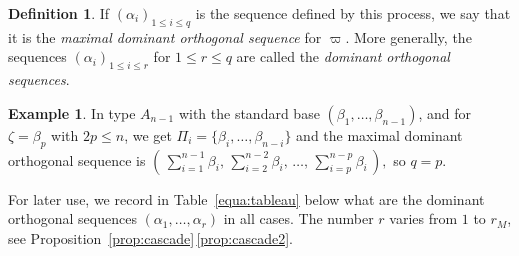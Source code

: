 \documentclass[JEP,XML,SOM,Unicode,NoFloatCountersInSection]{cedram}
\theoremstyle{plain}
\theoremstyle{definition}
\newtheorem{defi}[theo]{Definition}
\newtheorem{exem}[theo]{Example}
\begin{document}
\begin{defi}
\label{def:cascade}
If $(\alpha_i)_{1 \leq i \leq q}$ is the sequence defined by this process,
we say that it is the \emph{maximal dominant orthogonal sequence} for $\varpi$. More generally,
the sequences $(\alpha_i)_{1 \leq i \leq r}$ for $1\leq
r\leq q$ are called the \emph{dominant orthogonal sequences}.
\end{defi}

\begin{exem}
\label{exem:cascade}
In type $A_{n-1}$ with the standard base $(\beta_1,\ldots,\beta_{n-1})$,
and for
$\zeta=\beta_p$ with $2p\leq n$, we get $\Pi_i=\{\beta_i,\ldots,\beta_{n-i}\}$ and the maximal
dominant orthogonal sequence is
$(\, \sum_{i=1}^{n-1}\beta_i, \, \sum_{i=2}^{n-2}\beta_i,\, \ldots, \, \sum_{i=p}^{n-p}\beta_i
\,),$ so $q=p$.
\end{exem}

For later use, we record in Table~\ref{equa:tableau} below what are
the dominant orthogonal sequences $(\alpha_1,\ldots,\alpha_r)$ in all cases. The number $r$ varies from
$1$ to $r_M$, see Proposition~\ref{prop:cascade}\,\eqref{prop:cascade2}.
\end{document}

